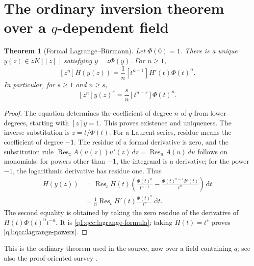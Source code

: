 \documentclass[11pt,a4paper,oneside,openany]{book}
\newtheorem{theorem}{Theorem}[chapter]
\theoremstyle{definition}
\theoremstyle{remark}
\DeclareMathOperator{\Res}{Res}
\newcommand{\dd}{\,\mathrm d}
\newcommand{\qbname}{\texorpdfstring{$q$}{q}}
\begin{document}
\section{The ordinary inversion theorem over a \qbname-dependent field}
\begin{theorem}[Formal Lagrange--B\"urmann]\label{q1:qcc:lagrange-theorem}
Let \(\Phi(0)=1\). There is a unique \(y(z)\in zK[[z]]\) satisfying
\(y=z\Phi(y)\). For \(n\ge1\),
\begin{equation}\label{q1:qcc:lagrange-formula}
 [z^n]H(y(z))=\frac1n[t^{n-1}]H'(t)\Phi(t)^n.
\end{equation}
In particular, for \(s\ge1\) and \(n\ge s\),
\begin{equation}\label{q1:qcc:lagrange-powers}
 [z^n]y(z)^s=\frac{s}{n}[t^{n-s}]\Phi(t)^n.
\end{equation}
\end{theorem}
\begin{proof}
The equation determines the coefficient of degree \(n\) of \(y\) from lower
degrees, starting with \([z]y=1\). This proves existence and uniqueness.
The inverse substitution is \(z=t/\Phi(t)\).
For a Laurent series, residue means the coefficient of degree \(-1\).
The residue of a formal derivative is zero, and the substitution rule
\(\Res_z A(u(z))u'(z)\,dz=\Res_u A(u)\,du\) follows on monomials:
for powers other than \(-1\), the integrand is a derivative; for the power
\(-1\), the logarithmic derivative has residue one.
Thus
\begin{align*}
 [z^n]H(y(z))
 &=\Res_t H(t)\left(\frac{\Phi(t)^n}{t^{n+1}}
                   -\frac{\Phi(t)^{n-1}\Phi'(t)}{t^n}\right)\dd t\\
 &=\frac1n\Res_t H'(t)\frac{\Phi(t)^n}{t^n}\dd t.
\end{align*}
The second equality is obtained by taking the zero residue of the derivative
of \(H(t)\Phi(t)^nt^{-n}\). It is \eqref{q1:qcc:lagrange-formula}; taking
\(H(t)=t^s\) proves \eqref{q1:qcc:lagrange-powers}.
\end{proof}
This is the ordinary theorem used in the source, now over a field containing
\(q\); see also the proof-oriented survey \cite{gessel}.
\end{document}
